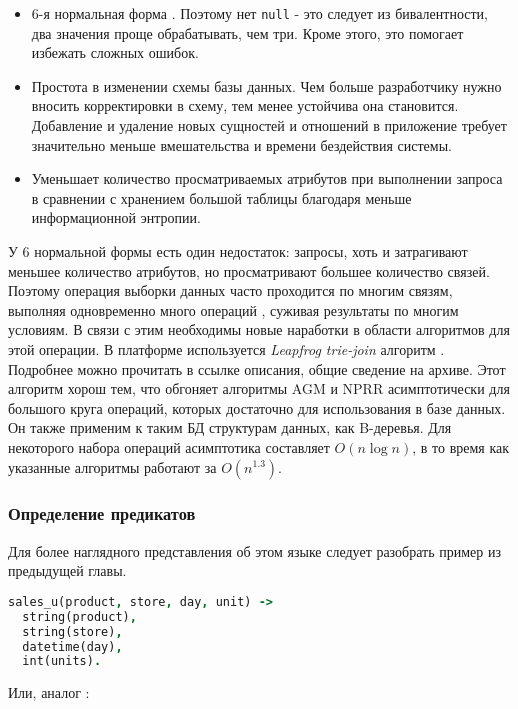 \begin{itemize}
  \item 6-я нормальная форма \cite{intro_into_db}. Поэтому нет \lstinline{null} - это следует из бивалентности, два значения проще обрабатывать, чем три. Кроме этого, это помогает избежать сложных ошибок. \cite{three_valued_logic}
  \item Простота в изменении схемы базы данных. Чем больше разработчику нужно вносить корректировки в схему, тем менее устойчива она становится. Добавление и удаление новых сущностей и отношений в \logiql приложение требует значительно меньше вмешательства и времени бездействия системы.
  \item Уменьшает количество просматриваемых атрибутов при выполнении запроса в сравнении с хранением большой таблицы благодаря меньше информационной энтропии.
\end{itemize}

У 6 нормальной формы есть один недостаток: запросы, хоть и затрагивают меньшее количество атрибутов, но просматривают большее количество связей. Поэтому операция выборки данных часто проходится по многим связям, выполняя одновременно много операций \join, суживая результаты по многим условиям. В связи с этим необходимы новые наработки в области алгоритмов для этой операции. В платформе используется \emph{Leapfrog trie-join} алгоритм \cite{leapfrog_tree_join_algo}. Подробнее можно прочитать в ссылке описания, общие сведение на архиве. Этот алгоритм хорош тем, что обгоняет алгоритмы AGM и NPRR асимптотически для большого круга операций, которых достаточно для использования в базе данных. Он также применим к таким БД структурам данных, как B-деревья. Для некоторого набора операций асимптотика составляет $O(n\log{n})$, в то время как указанные алгоритмы работают за $O(n^{1.3})$.


\subsubsection{Определение предикатов}
\label{sec:technology:logiql:predicates}

Для более наглядного представления об этом языке следует разобрать пример из предыдущей главы.

\begin{lstlisting}[language=Prolog]
sales_u(product, store, day, unit) ->
  string(product),
  string(store),
  datetime(day),
  int(units).
\end{lstlisting}

Или, аналог \sql:

